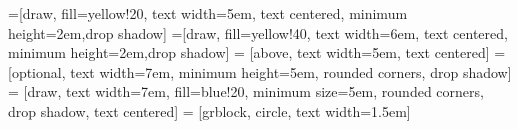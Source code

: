 
\theoremstyle{plain}
\newtheorem{definition}[subsection]{Definition}    %

\newtheorem{example}{Ejemplo}										 %

\newtheorem{theorem}{Teorema}											 %

\newtheorem*{proofa}{Prueba}

\hypersetup{urlcolor=blue}			 %

\newcommand{\fn}[1]{\texttt{#1}}						%
\newcommand{\cn}[1]{\texttt{\char92 #1}}
\newcommand{\gnuradio}{\emph{GNURadio }}



\lstset{language=Python,basicstyle=\footnotesize\sffamily,captionpos=b, showstringspaces=false,frame=single}
\renewcommand{\lstlistingname}{Listado}
\renewcommand{\lstlistlistingname}{\'Indice de listados}

=[draw, fill=yellow!20, text width=5em, 
    text centered, minimum height=2em,drop shadow]
=[draw, fill=yellow!40, text width=6em, 
text centered, minimum height=2em,drop shadow]
 = [above, text width=5em, text centered]
 = [optional, text width=7em, 
    minimum height=5em, rounded corners, drop shadow]
 = [draw, text width=7em, fill=blue!20, 
    minimum size=5em, rounded corners, drop shadow, text centered]
 = [grblock, circle, text width=1.5em]
    
\def\antenna{-- +(0mm,4.0mm) -- +(2.625mm,7.5mm) -- +(-2.625mm,7.5mm) -- +(0mm,4.0mm)}
    
\def\blockdist{2.3}
\def\edgedist{2.5}